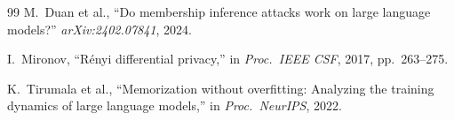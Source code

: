 \documentclass[conference]{IEEEtran}
\begin{document}
\begin{thebibliography}{99}
M.~Duan et al., ``Do membership inference attacks work on large language models?'' \textit{arXiv:2402.07841}, 2024.

I.~Mironov, ``R\'{e}nyi differential privacy,'' in \textit{Proc.\ IEEE CSF}, 2017, pp.~263--275.

K.~Tirumala et al., ``Memorization without overfitting: Analyzing the training dynamics of large language models,'' in \textit{Proc.\ NeurIPS}, 2022.

\end{thebibliography}
\end{document}
